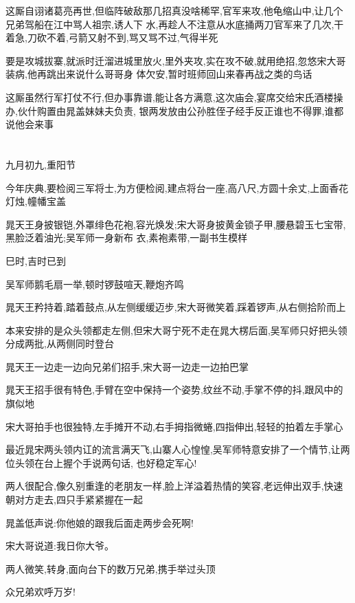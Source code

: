 ﻿\documentclass[12pt]{article}
\begin{document}
这厮自诩诸葛亮再世,但临阵破敌那几招真没啥稀罕,官军来攻,他龟缩山中,让几个兄弟驾船在江中骂人祖宗,诱人下
水,再趁人不注意从水底捅两刀\dldots 官军来了几次,干着急,刀砍不着,弓箭又射不到,骂又骂不过,气得半死

要是攻城拔寨,就派时迁溜进城里放火,里外夹攻,实在攻不破,就用绝招,忽悠宋大哥装病,他再跳出来说什么哥哥身
体欠安,暂时班师回山来春再战之类的鸟话\dldots

这厮虽然行军打仗不行,但办事靠谱,能让各方满意,这次庙会,宴席交给宋氏酒楼操办,伙什购置由晁盖妹妹夫负责,
银两发放由公孙胜侄子经手\dldots 反正谁也不得罪,谁都说他会来事

\section{}

九月初九,重阳节

今年庆典,要检阅三军将士,为方便检阅,建点将台一座,高八尺,方圆十余丈,上面香花灯烛,幢幡宝盖

晁天王身披银铠,外罩绯色花袍,容光焕发;宋大哥身披黄金锁子甲,腰悬碧玉七宝带,黑脸泛着油光;吴军师一身新布
衣,素袍素带,一副书生模样

巳时,吉时已到

吴军师鹅毛扇一举,顿时锣鼓喧天,鞭炮齐鸣

晁天王矜持着,踏着鼓点,从左侧缓缓迈步,宋大哥微笑着,踩着锣声,从右侧拾阶而上

本来安排的是众头领都走左侧,但宋大哥宁死不走在晁大楞后面,吴军师只好把头领分成两批,从两侧同时登台

晁天王一边走一边向兄弟们招手,宋大哥一边走一边拍巴掌

晁天王招手很有特色,手臂在空中保持一个姿势,纹丝不动,手掌不停的抖,跟风中的旗似地

宋大哥拍手也很独特,左手摊开不动,右手拇指微蜷,四指伸出,轻轻的拍着左手掌心\dldots

最近晁宋两头领内讧的流言满天飞,山寨人心惶惶,吴军师特意安排了一个情节,让两位头领在台上握个手说两句话,
也好稳定军心!

两人很配合,像久别重逢的老朋友一样,脸上洋溢着热情的笑容,老远伸出双手,快速朝对方走去,四只手紧紧握在一起

晁盖低声说:你他娘的跟我后面走两步会死啊!

宋大哥说道:我日你大爷。

两人微笑,转身,面向台下的数万兄弟,携手举过头顶

众兄弟欢呼万岁! 

\section{}
\end{document}

